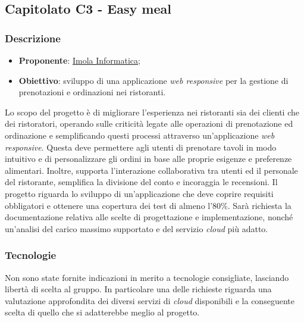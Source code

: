 \subsection{Capitolato C3 - Easy meal}


\subsubsection{Descrizione}
\begin{itemize}
    \item \textbf{Proponente}: \href{https://imolainformatica.it/}{Imola Informatica};
    \item \textbf{Obiettivo}: sviluppo di una applicazione \textit{web responsive} per la gestione di prenotazioni e ordinazioni nei ristoranti.
\end{itemize}
Lo scopo del progetto è di migliorare l'esperienza nei ristoranti sia dei clienti che dei ristoratori, operando sulle criticità legate alle operazioni di prenotazione ed ordinazione e semplificando questi processi attraverso un'applicazione \textit{web responsive}. 
Questa deve permettere agli utenti di prenotare tavoli in modo intuitivo e di personalizzare gli ordini in base alle proprie esigenze e preferenze alimentari. 
Inoltre, supporta l'interazione collaborativa tra utenti ed il personale del ristorante, semplifica la divisione del conto e incoraggia le recensioni. 
Il progetto riguarda lo sviluppo di un'applicazione che deve coprire requisiti obbligatori e ottenere una copertura dei test di almeno l'80\%. 
Sarà richiesta la documentazione relativa alle scelte di progettazione e implementazione, nonché un'analisi del carico massimo supportato e del servizio \textit{cloud} più adatto.

\subsubsection{Tecnologie}
Non sono state fornite indicazioni in merito a tecnologie consigliate, lasciando libertà di scelta al gruppo. 
In particolare una delle richieste riguarda una valutazione approfondita dei diversi servizi di \textit{cloud} disponibili e la conseguente scelta di quello che si adatterebbe meglio al progetto.


